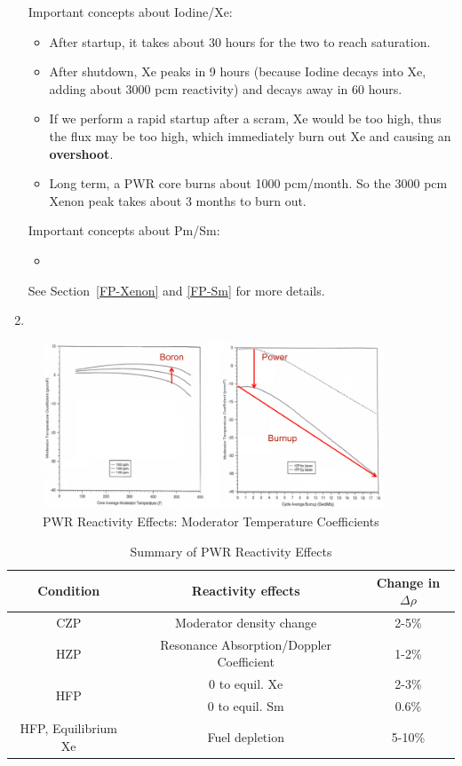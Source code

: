 \documentclass{school-22.211-notes}
\begin{document}
\begin{enumerate}
Important concepts about Iodine/Xe:
\begin{itemize}
\item After startup, it takes about 30 hours for the two to reach saturation. 
\item After shutdown, Xe peaks in 9 hours (because Iodine decays into Xe, adding about 3000 pcm reactivity) and decays away in 60 hours. 
\item If we perform a rapid startup after a scram, Xe would be too high, thus the flux may be too high, which immediately burn out Xe and causing an \textbf{overshoot}. 
\item Long term, a PWR core burns about 1000 pcm/month. So the 3000 pcm Xenon peak takes about 3 months to burn out. 
\end{itemize}

Important concepts about Pm/Sm: 
\begin{itemize}
\item 
\end{itemize}

See Section~\ref{FP-Xenon} and \ref{FP-Sm} for more details.


\item {}
\end{enumerate}


\begin{figure}[ht]
  \centering
  \includegraphics[width=4in]{images/design/moderator-temp-coeff.png}
  \caption{PWR Reactivity Effects: Moderator Temperature Coefficients} \label{PWR-rho}
\end{figure}



\begin{table}[ht]
  \centering
  \begin{tabular}{c|c|c} \hline
    Condition & Reactivity effects & Change in $\Delta \rho$ \\ \hline
    CZP & Moderator density change & 2-5\% \\ \hline
    HZP & Resonance Absorption/Doppler Coefficient & 1-2\% \\ \hline
    \multirow{2}{*}{HFP} & 0 to equil. Xe & 2-3\% \\ 
    & 0 to equil. Sm & 0.6\% \\ \hline
    HFP, Equilibrium Xe & Fuel depletion & 5-10\% \\ \hline
  \end{tabular}
  \caption{Summary of PWR Reactivity Effects} \label{PWR-reactivity}
\end{table}
\end{document}
